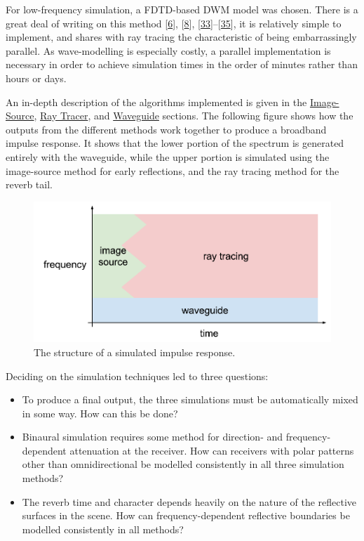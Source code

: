 \documentclass[]{scrreprt}
\providecommand{\tightlist}{%
  \setlength{\itemsep}{0pt}\setlength{\parskip}{0pt}}
\begin{document}
For low-frequency simulation, a FDTD-based DWM model was chosen. There
is a great deal of writing on this method
{[}\protect\hyperlink{ref-murphyux5fdigitalux5f2000}{6}{]},
{[}\protect\hyperlink{ref-camposux5fcomputationalux5f2005}{8}{]},
{[}\protect\hyperlink{ref-vanux5fduyneux5f3dux5f1996}{33}{]}--{[}\protect\hyperlink{ref-kowalczykux5froomux5f2011}{35}{]},
it is relatively simple to implement, and shares with ray tracing the
characteristic of being embarrassingly parallel. As wave-modelling is
especially costly, a parallel implementation is necessary in order to
achieve simulation times in the order of minutes rather than hours or
days.

An in-depth description of the algorithms implemented is given in the
\href{\%7B\%7B\%20site.baseurl\%20\%7D\%7D\%7B\%\%20link\%20image_source.md\%20\%\%7D}{Image-Source},
\href{\%7B\%7B\%20site.baseurl\%20\%7D\%7D\%7B\%\%20link\%20ray_tracer.md\%20\%\%7D}{Ray
Tracer}, and
\href{\%7B\%7B\%20site.baseurl\%20\%7D\%7D\%7B\%\%20link\%20waveguide.md\%20\%\%7D}{Waveguide}
sections. The following figure \text{(\ref{fig:regions})} shows how the
outputs from the different methods work together to produce a broadband
impulse response. It shows that the lower portion of the spectrum is
generated entirely with the waveguide, while the upper portion is
simulated using the image-source method for early reflections, and the
ray tracing method for the reverb tail.

\begin{figure}[htbp]
\centering
\includegraphics{images/regions.pdf}
\caption{The structure of a simulated impulse
response.\label{fig:regions}}
\end{figure}

Deciding on the simulation techniques led to three questions:

\begin{itemize}
\tightlist
\item
  To produce a final output, the three simulations must be automatically
  mixed in some way. How can this be done?
\item
  Binaural simulation requires some method for direction- and
  frequency-dependent attenuation at the receiver. How can receivers
  with polar patterns other than omnidirectional be modelled
  consistently in all three simulation methods?
\item
  The reverb time and character depends heavily on the nature of the
  reflective surfaces in the scene. How can frequency-dependent
  reflective boundaries be modelled consistently in all methods?
\end{itemize}
\end{document}
